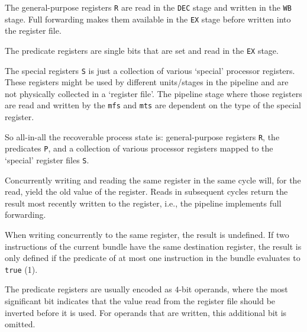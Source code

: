 \documentclass[a4paper,fontsize=10pt,twoside,DIV15,BCOR12mm,headinclude=true,footinclude=false,pagesize,bibtotoc]{scrbook}
\newcommand{\code}[1]{{\texttt{#1}}}
\newcommand{\comment}[3]{

\textsf{\textbf{#1}} {\color{#3}#2}}
\newcommand{\wolf}[1]{\comment{Wolfgang}{#1}{OliveGreen}}
\newcommand{\martin}[1]{\comment{Martin}{#1}{Blue}}
\newcommand{\stefan}[1]{\comment{Stefan}{#1}{RoyalPurple}}
\renewcommand{\wolf}[1]{}
\renewcommand{\martin}[1]{}
\renewcommand{\stefan}[1]{}
\begin{document}
The general-purpose registers \texttt{R} are read in the \code{DEC} stage
and written in the \code{WB} stage. Full forwarding makes them available
in the \code{EX} stage before written into the register file.

The predicate registers are single bits that are set and read in the \code{EX}
stage.

The special registers \code{S} is just a collection of various `special'
processor registers. These registers might be used by different units/stages
in the pipeline and are not physically collected in a `register file'.
The pipeline stage where those registers are read and written by the
\code{mfs} and \code{mts} are dependent on the type of the special
register.

\martin{The three `register' files shall constitute the state of the processor.
Every non-obvious register, such as method base, shall be mapped to a
`special' register. Even the current PC on an interrupt shall end up in a
register that is mapped into the special register domain.}

\stefan{Umm .. it would be really good to define somewhere in which stages which special register is actually read or written by mfs/mts
;).}

So all-in-all the recoverable process state is: general-purpose registers
\code{R}, the predicates \code{P}, and a collection of various processor
registers mapped to the `special' register files \code{S}.

Concurrently writing and reading the same register in the same cycle
will, for the read, yield the old value of the register. Reads in
subsequent cycles return the result most recently written to the
register, i.e., the pipeline implements full forwarding.

When writing concurrently to the same register, the result is
undefined. If two instructions of the current bundle have the same
destination register, the result is only defined if the predicate of
at most one instruction in the bundle evaluates to \texttt{true} (1).

\wolf{In practice, the result is even defined if both instructions
  write to the same register, but I would not make this a feature of
  the ISA.}

The predicate registers are usually encoded as $4$-bit operands, where the most
significant bit indicates that the value read from the register file should be
inverted before it is used. For operands that are written, this additional bit
is omitted.
\end{document}

